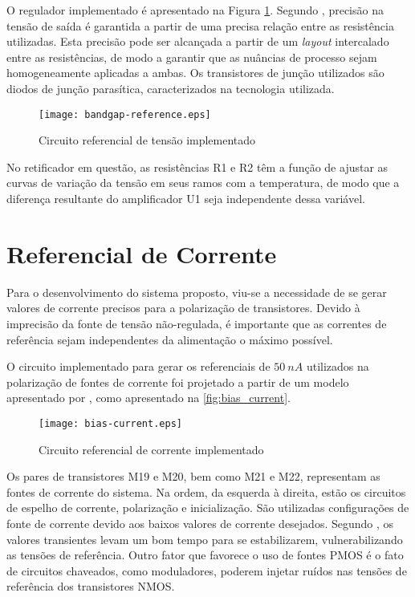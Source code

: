 O regulador implementado é apresentado na Figura \ref{fig:bandgap}. Segundo , precisão na tensão de saída é garantida a partir de uma precisa relação entre as resistência utilizadas. Esta precisão pode ser alcançada a partir de um \textit{layout} intercalado entre as resistências, de modo a garantir que as nuâncias de processo sejam homogeneamente aplicadas a ambas. Os transistores de junção utilizados são diodos de junção parasítica, caracterizados na tecnologia utilizada.

\begin{figure}[!htb]
	\caption{\label{fig:bandgap}Circuito referencial de tensão implementado}
	\begin{center}
		\texttt{[image: bandgap-reference.eps]}
	\end{center}
\end{figure}

No retificador em questão, as resistências {R1} e {R2} têm a função de ajustar as curvas de variação da tensão em seus ramos com a temperatura, de modo que a diferença resultante do amplificador {U1} seja independente dessa variável.

\section{Referencial de Corrente}
Para o desenvolvimento do sistema proposto, viu-se a necessidade de se gerar valores de corrente precisos para a polarização de transistores. Devido à imprecisão da fonte de tensão não-regulada, é importante que as correntes de referência sejam independentes da alimentação o máximo possível.

O circuito implementado para gerar os referenciais de $50~nA$ utilizados na polarização de fontes de corrente foi projetado a partir de um modelo apresentado por , como apresentado na \autoref{fig:bias_current}.

\begin{figure}[!h]
	\caption{\label{fig:bias_current}Circuito referencial de corrente implementado}
	\begin{center}
		\texttt{[image: bias-current.eps]}
	\end{center}
\end{figure}

Os pares de transistores {M19} e {M20}, bem como {M21} e {M22}, representam as fontes de corrente do sistema. Na ordem, da esquerda à direita, estão os circuitos de espelho de corrente, polarização e inicialização. São utilizadas configurações de fonte de corrente devido aos baixos valores de corrente desejados. Segundo , os valores transientes levam um bom tempo para se estabilizarem, vulnerabilizando as tensões de referência. Outro fator que favorece o uso de fontes {PMOS} é o fato de circuitos chaveados, como moduladores, poderem injetar ruídos nas tensões de referência dos transistores {NMOS}.

